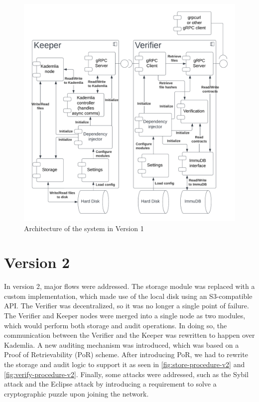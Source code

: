 \begin{figure}
    \centering
    \includegraphics[width=1\textwidth]{gfx/arch-v1.png}
    \caption{Architecture of the system in Version 1}
    \label{fig:architecture-v1}
\end{figure}

\section{Version 2}

In version 2, major flows were addressed.
The storage module was replaced with a custom implementation, which made use of the local disk
using an S3-compatible API.
The Verifier was decentralized, so it was no longer a single point of failure.
The Verifier and Keeper nodes were merged into a single node as two modules,
which would perform both storage and audit operations.
In doing so, the communication between the Verifier and the Keeper was rewritten to happen over Kademlia.
A new auditing mechanism was introduced, which was based on a Proof of Retrievability (PoR) scheme.
After introducing PoR, we had to rewrite the storage and audit logic to support it
as seen in \ref{fig:store-procedure-v2} and \ref{fig:verify-procedure-v2}.
Finally, some attacks were addressed, such as the Sybil attack and the Eclipse attack by introducing
a requirement to solve a cryptographic puzzle upon joining the network.

